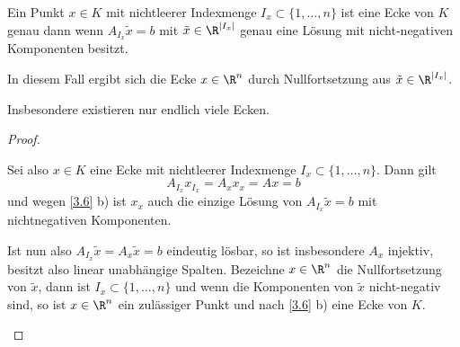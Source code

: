 \begin{kor} \label{3.7}
	Ein Punkt $x \in K$ mit nichtleerer Indexmenge $I_x \subset \{1, \dotsc, n\}$ ist eine Ecke von $K$ genau dann wenn $A_{I_x} \tilde x = b$ mit $\tilde x \in \R^{|I_x|}$ genau eine Lösung mit nicht-negativen Komponenten besitzt.

	In diesem Fall ergibt sich die Ecke $x \in \R^n$ durch Nullfortsetzung aus $\tilde x \in \R^{|I_x|}$.

	Insbesondere existieren nur endlich viele Ecken.
	\begin{proof}
		\begin{segnb}[„$\implies$“]
			Sei also $x \in K$ eine Ecke mit nichtleerer Indexmenge $I_x \subset \{1, \dotsc, n\}$.
			Dann gilt
			\[
				A_{I_x} x_{I_x} = A_x x_x = Ax = b
			\]
			und wegen \ref{3.6} b) ist $x_x$ auch die einzige Lösung von $A_{I_x} \tilde x = b$ mit nichtnegativen Komponenten.
		\end{segnb}
		\begin{segnb}[„$\impliedby$“]
			Ist nun also $A_{I_x} \tilde x = A_x \tilde x = b$ eindeutig lösbar, so ist insbesondere $A_x$ injektiv, besitzt also linear unabhängige Spalten.
			Bezeichne $x \in \R^n$ die Nullfortsetzung von $\tilde x$, dann ist $I_x \subset \{1, \dotsc, n\}$ und wenn die Komponenten von $\tilde x$ nicht-negativ sind, so ist $x \in \R^n$ ein zulässiger Punkt und nach \ref{3.6} b) eine Ecke von $K$.
		\end{segnb}
	\end{proof}
\end{kor}

